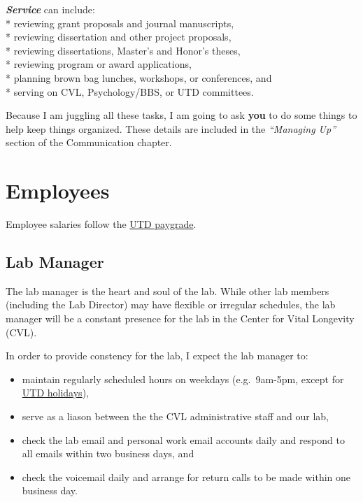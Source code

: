 \documentclass[]{book}
\providecommand{\tightlist}{%
  \setlength{\itemsep}{0pt}\setlength{\parskip}{0pt}}
\begin{document}
\textbf{\emph{Service}} can include:\\
* reviewing grant proposals and journal manuscripts,\\
* reviewing dissertation and other project proposals,\\
* reviewing dissertations, Master's and Honor's theses,\\
* reviewing program or award applications,\\
* planning brown bag lunches, workshops, or conferences, and\\
* serving on CVL, Psychology/BBS, or UTD committees.

Because I am juggling all these tasks, I am going to ask \textbf{you} to do some things to help keep things organized. These details are included in the \emph{``Managing Up''} section of the Communication chapter.

\hypertarget{employees}{%
\section{Employees}\label{employees}}

Employee salaries follow the \href{https://www.utdallas.edu/hr/compensation/classified/}{UTD paygrade}.

\hypertarget{lab-manager}{%
\subsection{Lab Manager}\label{lab-manager}}

The lab manager is the heart and soul of the lab. While other lab members (including the Lab Director) may have flexible or irregular schedules, the lab manager will be a constant presence for the lab in the Center for Vital Longevity (CVL).

In order to provide constency for the lab, I expect the lab manager to:

\begin{itemize}
\tightlist
\item
  maintain regularly scheduled hours on weekdays (e.g.~9am-5pm, except for \href{https://www.utdallas.edu/hr/news/holidays/}{UTD holidays}),
\item
  serve as a liason between the the CVL administrative staff and our lab,\\
\item
  check the lab email and personal work email accounts daily and respond to all emails within two business days, and\\
\item
  check the voicemail daily and arrange for return calls to be made within one business day.
\end{itemize}
\end{document}
